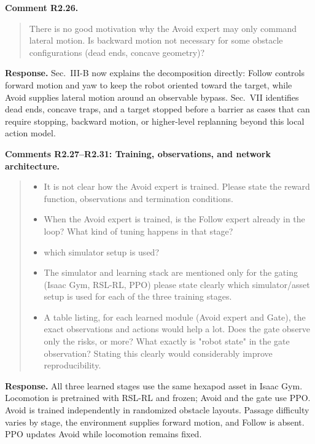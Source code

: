 \documentclass[letterpaper,11pt]{article}
\begin{document}
\noindent\textbf{Comment R2.26.}
\begin{quote}\color{reviewgray}
There is no good motivation why the Avoid expert may only command lateral motion. Is backward motion not necessary for some obstacle configurations (dead ends, concave geometry)?
\end{quote}
\noindent\textbf{Response.}
Sec.~III-B now explains the decomposition directly: Follow controls forward motion and yaw to keep the robot oriented toward the target, while Avoid supplies lateral motion around an observable bypass. Sec.~VII identifies dead ends, concave traps, and a target stopped before a barrier as cases that can require stopping, backward motion, or higher-level replanning beyond this local action model.
\par\nopagebreak[4]


\noindent\textbf{Comments R2.27--R2.31: Training, observations, and network architecture.}
\begin{quote}\color{reviewgray}
\begin{itemize}[leftmargin=*,nosep,label={}]
\item[\textbf{R2.27.}] It is not clear how the Avoid expert is trained. Please state the reward function, observations and termination conditions.
\item[\textbf{R2.28.}] When the Avoid expert is trained, is the Follow expert already in the loop? What kind of tuning happens in that stage?
\item[\textbf{R2.29.}] which simulator setup is used?
\item[\textbf{R2.30.}] The simulator and learning stack are mentioned only for the gating (Isaac Gym, RSL-RL, PPO) please state clearly which simulator/asset setup is used for each of the three training stages.
\item[\textbf{R2.31.}] A table listing, for each learned module (Avoid expert and Gate), the exact observations and actions would help a lot. Does the gate observe only the risks, or more? What exactly is "robot state" in the gate observation? Stating this clearly would considerably improve reproducibility.
\end{itemize}
\end{quote}
\noindent\textbf{Response.}
All three learned stages use the same hexapod asset in Isaac Gym. Locomotion is pretrained with RSL-RL and frozen; Avoid and the gate use PPO. Avoid is trained independently in randomized obstacle layouts. Passage difficulty varies by stage, the environment supplies forward motion, and Follow is absent. PPO updates Avoid while locomotion remains fixed.
\end{document}
